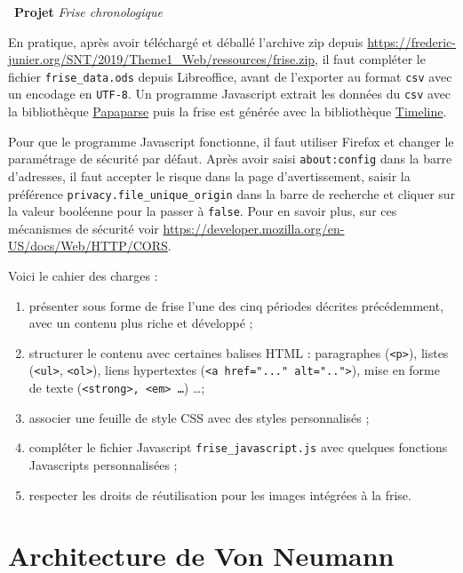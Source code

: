 \documentclass[a4paper, french, 11pt]{article}  %
\newcounter{proj}
\newenvironment{projet}[1]
{\par \medskip   \addtocounter{proj}{1} \noindent  
 \begin {bclogo}[noborder = true, barre=zigzag,logo=\bcloupe, marge=4] {~\textbf{Projet} \textbf{\theproj} {\itshape #1} }  \par}
{
\end{bclogo}
 \par \bigskip }
\newcounter{prog}
\begin{document}
\begin{projet}{Frise chronologique}
En pratique, après avoir téléchargé et déballé l'archive zip depuis \url{https://frederic-junier.org/SNT/2019/Theme1_Web/ressources/frise.zip}, il faut  compléter le  fichier \texttt{frise\_data.ods} depuis  Libreoffice, avant de l'exporter au format \texttt{csv} avec un encodage en \texttt{UTF-8}. Un  programme Javascript extrait les données du \texttt{csv} avec    la bibliothèque \href{https://www.papaparse.com/}{Papaparse} puis la frise est générée avec la bibliothèque    \href{https://timeline.knightlab.com/}{Timeline}. 

Pour que le programme Javascript fonctionne, il faut utiliser Firefox et changer le paramétrage de sécurité par défaut. Après avoir saisi \texttt{about:config} dans la barre d'adresses, il faut accepter le risque dans la page d'avertissement, saisir la préférence \texttt{privacy.file\_unique\_origin} dans la barre de recherche et cliquer sur la valeur booléenne pour la passer à \texttt{false}. Pour en savoir plus, sur ces mécanismes de sécurité  voir \url{https://developer.mozilla.org/en-US/docs/Web/HTTP/CORS}.

\bigskip

Voici le cahier des charges :

\begin{enumerate}
	\item présenter sous forme de frise l'une des cinq périodes décrites précédemment, avec un contenu plus riche et développé ;
	\item structurer le contenu  avec certaines balises HTML :  paragraphes (\texttt{<p>}), listes (\texttt{<ul>}, \texttt{<ol>}), liens hypertextes (\texttt{<a href="..." alt="..">}),  mise en forme de texte (\texttt{<strong>, <em> \ldots}) \ldots ;
	\item associer une feuille de style CSS avec des styles personnalisés ;
	\item compléter le fichier Javascript \texttt{frise\_javascript.js} avec quelques fonctions Javascripts personnalisées  ;
	\item respecter les droits de réutilisation pour les images intégrées à la frise.
\end{enumerate}





\end{projet}


\section{Architecture de Von Neumann}
\end{document}
